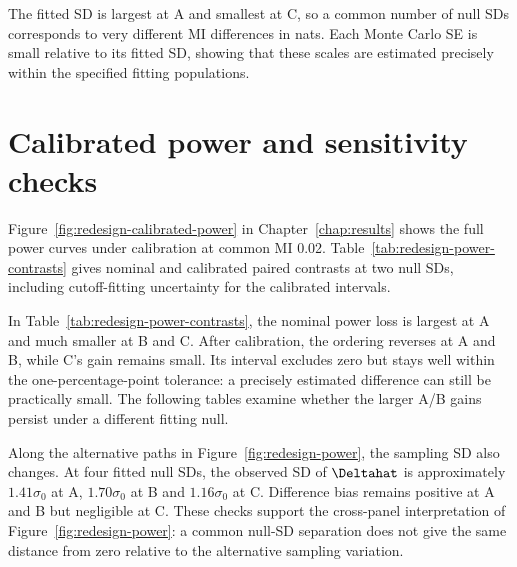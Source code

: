 \begin{table}[H]
\centering
\small
\caption{Independently fitted null standard deviations.}
\label{tab:redesign-null-sd-fitting}

\end{table}

The fitted SD is largest at A and smallest at C, so a common number of
null SDs corresponds to very different MI differences in nats. Each
Monte Carlo SE is small relative to its fitted SD, showing that these
scales are estimated precisely within the specified fitting populations.

\section{Calibrated power and sensitivity checks}
\label{sec:calibration-sensitivity-results}

Figure~\ref{fig:redesign-calibrated-power} in Chapter~\ref{chap:results}
shows the full power curves
under calibration at common MI 0.02. Table~\ref{tab:redesign-power-contrasts}
gives nominal and calibrated paired contrasts at two null SDs, including
cutoff-fitting uncertainty for the calibrated intervals.

\begin{table}[H]
\centering
\small
\setlength{\tabcolsep}{3pt}
\caption{Expanded Welch minus Normal Wald power at two null SDs, in percentage points.}
\label{tab:redesign-power-contrasts}

\end{table}

In Table~\ref{tab:redesign-power-contrasts}, the nominal power loss is
largest at A and much smaller at B and C.
After calibration, the ordering reverses at A and B, while C's gain
remains small. Its interval excludes zero but stays well within the
one-percentage-point tolerance: a precisely estimated difference can
still be practically small. The following tables examine whether the
larger A/B gains persist under a different fitting null.

Along the alternative paths in Figure~\ref{fig:redesign-power}, the
sampling SD also changes. At four
fitted null SDs, the observed SD of \(\Deltahat\) is approximately
\(1.41\sigma_0\) at A, \(1.70\sigma_0\) at B and
\(1.16\sigma_0\) at C. Difference bias remains positive at A and B
but negligible at C. These checks support the cross-panel interpretation
of Figure~\ref{fig:redesign-power}: a common null-SD separation does
not give the same distance from zero relative to the alternative
sampling variation.

